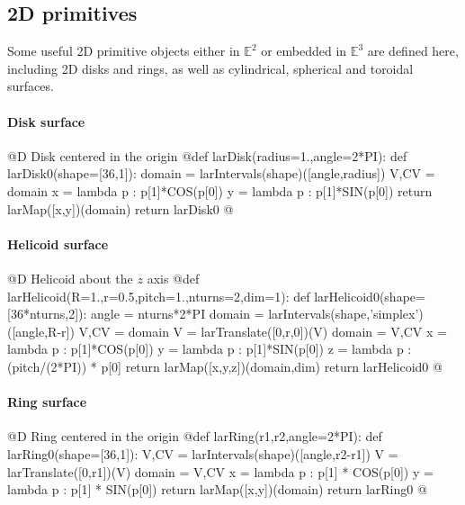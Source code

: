 \documentclass[11pt,oneside]{article}	%
\def\E{\mathbb{E}}
\begin{document}
\subsection{2D primitives}
Some useful 2D primitive objects either in $\E^2$ or embedded in $\E^3$ are defined here, including 2D disks and rings, as well as cylindrical, spherical and toroidal surfaces.

\paragraph{Disk surface}
@D Disk centered in the origin
@{def larDisk(radius=1.,angle=2*PI):
	def larDisk0(shape=[36,1]):
		domain = larIntervals(shape)([angle,radius])
		V,CV = domain
		x = lambda p : p[1]*COS(p[0])
		y = lambda p : p[1]*SIN(p[0])
		return larMap([x,y])(domain)
	return larDisk0
@}
\paragraph{Helicoid surface}
@D Helicoid about the $z$ axis
@{def larHelicoid(R=1.,r=0.5,pitch=1.,nturns=2,dim=1):
	def larHelicoid0(shape=[36*nturns,2]):
		angle = nturns*2*PI
		domain = larIntervals(shape,'simplex')([angle,R-r])
		V,CV = domain
		V = larTranslate([0,r,0])(V)
		domain = V,CV
		x = lambda p : p[1]*COS(p[0])
		y = lambda p : p[1]*SIN(p[0])
		z = lambda p : (pitch/(2*PI)) * p[0]
		return larMap([x,y,z])(domain,dim)
	return larHelicoid0
@}

\paragraph{Ring surface}
@D Ring centered in the origin
@{def larRing(r1,r2,angle=2*PI):
	def larRing0(shape=[36,1]):
		V,CV = larIntervals(shape)([angle,r2-r1])
		V = larTranslate([0,r1])(V)
		domain = V,CV
		x = lambda p : p[1] * COS(p[0])
		y = lambda p : p[1] * SIN(p[0])
		return larMap([x,y])(domain)
	return larRing0
@}
\end{document}
